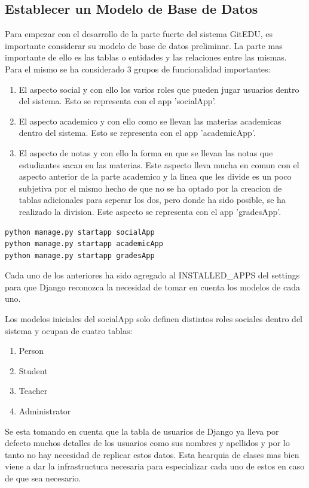 \subsection{Establecer un Modelo de Base de Datos}
Para empezar con el desarrollo de la parte fuerte del sistema GitEDU, es importante considerar su modelo de base de datos preliminar. La parte mas importante de ello es las tablas o entidades y las relaciones entre las mismas. Para el mismo se ha considerado 3 grupos de funcionalidad importantes:
\begin{enumerate}
	\item El aspecto social y con ello los varios roles que pueden jugar usuarios dentro del sistema. Esto se representa con el app 'socialApp'.
    \item El aspecto academico y con ello como se llevan las materias academicas dentro del sistema. Esto se representa con el app 'academicApp'.
    \item El aspecto de notas y con ello la forma en que se llevan las notas que estudiantes sacan en las materias. Este aspecto lleva mucha en comun con el aspecto anterior de la parte academico y la linea que les divide es un poco subjetiva por el mismo hecho de que no se ha optado por la creacion de tablas adicionales para seperar los dos, pero donde ha sido posible, se ha realizado la division. Este aspecto se representa con el app 'gradesApp'. 
\end{enumerate}

\begin{lstlisting}
python manage.py startapp socialApp
python manage.py startapp academicApp
python manage.py startapp gradesApp
\end{lstlisting}

Cada uno de los anteriores ha sido agregado al INSTALLED\_APPS del settings para que Django reconozca la necesidad de tomar en cuenta los modelos de cada uno.

Los modelos iniciales del socialApp solo definen distintos roles sociales dentro del sistema y ocupan de cuatro tablas:
\begin{enumerate}
	\item Person
	\item Student
	\item Teacher
	\item Administrator
\end{enumerate}
Se esta tomando en cuenta que la tabla de usuarios de Django ya lleva por defecto muchos detalles de los usuarios como sus nombres y apellidos y por lo tanto no hay necesidad de replicar estos datos. Esta hearquia de clases mas bien viene a dar la infrastructura necesaria para especializar cada uno de estos en caso de que sea necesario.

